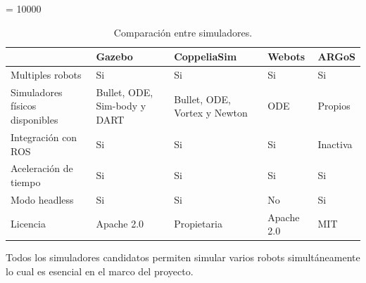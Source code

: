 \begin{table}[H]
\hbadness = 10000
\emergencystretch=10pt
\begin{center}
  \begin{tabularx}{\textwidth}{|X|X|X|X|X|}


\hline
                      & Gazebo                          & CoppeliaSim                      & Webots                          & ARGoS                               \\ \hline
Multiples robots      & \cellcolor{green!25}Si          & \cellcolor{green!25}Si           & \cellcolor{green!25}Si          & \cellcolor{green!25}Si              \\ \hline
Simuladores físicos disponibles &                                                                                                                                         
  \cellcolor{green!25}Bullet, ODE, Sim-body y DART  & 
  \cellcolor{green!25}Bullet, ODE, Vortex y Newton  &
  \cellcolor{green!25}ODE                           &
  \cellcolor{yellow!25} Propios                     \\ \hline
Integración con ROS   & \cellcolor{green!25}Si          & \cellcolor{green!25}Si           & \cellcolor{green!25}Si          & \cellcolor{red!25}Inactiva \\ \hline 
Aceleración de tiempo & \cellcolor{green!25}Si          & \cellcolor{green!25}Si           & \cellcolor{green!25}Si          & \cellcolor{green!25}Si     \\ \hline
Modo headless         & \cellcolor{green!25}Si          & \cellcolor{green!25}Si           & \cellcolor{red!25}No            & \cellcolor{green!25}Si     \\ \hline
Licencia              & \cellcolor{green!25}Apache 2.0  & \cellcolor{yellow!25}Propietaria & \cellcolor{green!25}Apache 2.0  & \cellcolor{green!25}MIT    \\ \hline
  \end{tabularx}
  \caption{Comparación entre simuladores.}
  \label{tab:sims}
\end{center}

\end{table}

Todos los simuladores candidatos permiten simular varios robots simultáneamente
lo cual es esencial en el marco del proyecto. 

